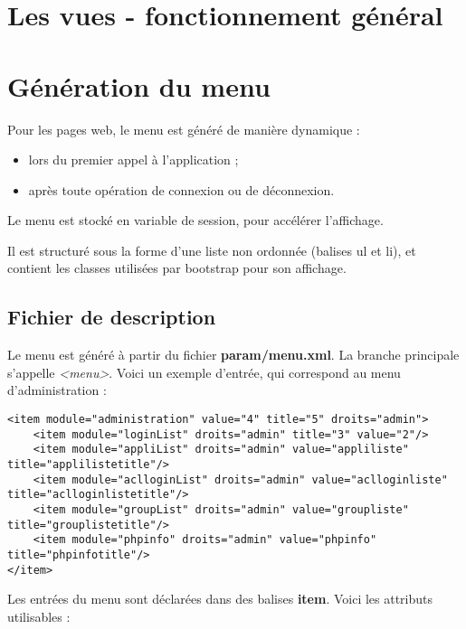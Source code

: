 \chapter{Les vues - fonctionnement général}\label{vue}

\chapter{Génération du menu}
Pour les pages web, le menu est généré de manière dynamique :
\begin{itemize}
\item lors du premier appel à l'application ;
\item après toute opération de connexion ou de déconnexion.
\end{itemize}

Le menu est stocké en variable de session, pour accélérer l'affichage.

Il est structuré sous la forme d'une liste non ordonnée (balises ul et li), et contient les classes utilisées par bootstrap pour son affichage.

\section{Fichier de description}

Le menu est généré à partir du fichier \textbf{param/menu.xml}. La branche principale s'appelle \textit{<menu>}. Voici un exemple d'entrée, qui correspond au menu d'administration :

\begin{lstlisting}
<item module="administration" value="4" title="5" droits="admin">
	<item module="loginList" droits="admin" title="3" value="2"/>
	<item module="appliList" droits="admin" value="appliliste" title="applilistetitle"/>
	<item module="aclloginList" droits="admin" value="aclloginliste" title="aclloginlistetitle"/>
	<item module="groupList" droits="admin" value="groupliste" title="grouplistetitle"/>
	<item module="phpinfo" droits="admin" value="phpinfo" title="phpinfotitle"/>
</item>
\end{lstlisting}

Les entrées du menu sont déclarées dans des balises \textbf{item}. Voici les attributs utilisables :

